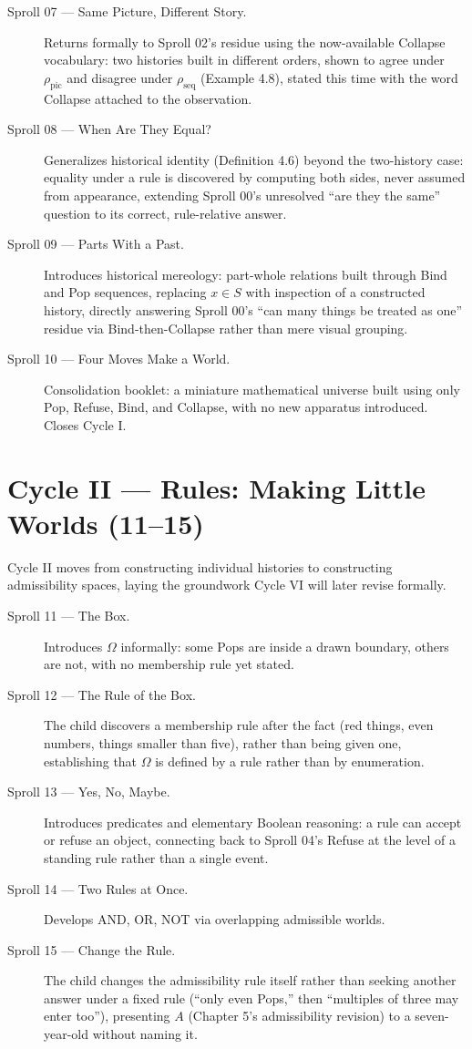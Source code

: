 \documentclass[11pt,twoside]{book}
\begin{document}
\begin{description}
\item[Sproll 07 --- Same Picture, Different Story.] Returns formally to Sproll 02's residue using the now-available Collapse vocabulary: two histories built in different orders, shown to agree under $\rho_{\mathrm{pic}}$ and disagree under $\rho_{\mathrm{seq}}$ (Example 4.8), stated this time with the word Collapse attached to the observation.
\item[Sproll 08 --- When Are They Equal?] Generalizes historical identity (Definition 4.6) beyond the two-history case: equality under a rule is discovered by computing both sides, never assumed from appearance, extending Sproll 00's unresolved ``are they the same'' question to its correct, rule-relative answer.
\item[Sproll 09 --- Parts With a Past.] Introduces historical mereology: part-whole relations built through Bind and Pop sequences, replacing $x \in S$ with inspection of a constructed history, directly answering Sproll 00's ``can many things be treated as one'' residue via Bind-then-Collapse rather than mere visual grouping.
\item[Sproll 10 --- Four Moves Make a World.] Consolidation booklet: a miniature mathematical universe built using only Pop, Refuse, Bind, and Collapse, with no new apparatus introduced. Closes Cycle I.
\end{description}

\chapter{Cycle II --- Rules: Making Little Worlds (11--15)}

Cycle II moves from constructing individual histories to constructing admissibility spaces, laying the groundwork Cycle VI will later revise formally.

\begin{description}
\item[Sproll 11 --- The Box.] Introduces $\Omega$ informally: some Pops are inside a drawn boundary, others are not, with no membership rule yet stated.
\item[Sproll 12 --- The Rule of the Box.] The child discovers a membership rule after the fact (red things, even numbers, things smaller than five), rather than being given one, establishing that $\Omega$ is defined by a rule rather than by enumeration.
\item[Sproll 13 --- Yes, No, Maybe.] Introduces predicates and elementary Boolean reasoning: a rule can accept or refuse an object, connecting back to Sproll 04's Refuse at the level of a standing rule rather than a single event.
\item[Sproll 14 --- Two Rules at Once.] Develops AND, OR, NOT via overlapping admissible worlds.
\item[Sproll 15 --- Change the Rule.] The child changes the admissibility rule itself rather than seeking another answer under a fixed rule (``only even Pops,'' then ``multiples of three may enter too''), presenting $A$ (Chapter 5's admissibility revision) to a seven-year-old without naming it.
\end{description}
\end{document}
